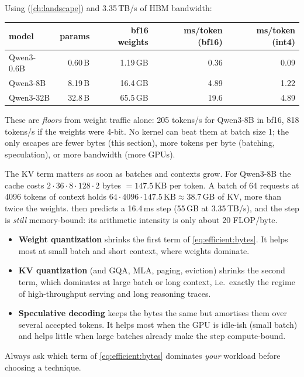 \begin{napkinmath}
Using  (\cref{ch:landscape}) and 3.35\,TB/s of HBM bandwidth:
\begin{center}\small
\begin{tabular}{lrrrr}
\toprule
model & params & bf16 weights & ms/token (bf16) & ms/token (int4) \\
\midrule
Qwen3-0.6B & 0.60\,B & 1.19\,GB & 0.36 & 0.09 \\
Qwen3-8B   & 8.19\,B & 16.4\,GB & 4.89 & 1.22 \\
Qwen3-32B  & 32.8\,B & 65.5\,GB & 19.6 & 4.89 \\
\bottomrule
\end{tabular}
\end{center}
These are \emph{floors} from weight traffic alone: 205 tokens/s for Qwen3-8B in bf16,
818 tokens/s if the weights were 4-bit. No kernel can beat them at batch size 1; the
only escapes are fewer bytes (this section), more tokens per byte (batching,
speculation), or more bandwidth (more GPUs).
\end{napkinmath}

The KV term matters as soon as batches and contexts grow. For Qwen3-8B the cache costs
$2\cdot 36\cdot 8\cdot 128\cdot 2$ bytes $=147.5$\,KB per token. A batch of 64 requests
at 4096 tokens of context holds $64\cdot 4096\cdot 147.5\,\text{KB}\approx 38.7$\,GB of
KV, more than twice the weights.  then predicts a 16.4\,ms step
(55\,GB at 3.35\,TB/s), and the step is \emph{still} memory-bound: its arithmetic
intensity is only about 20 FLOP/byte.

\begin{systemslens}
\begin{itemize}
  \item \textbf{Weight quantization} shrinks the first term of \cref{eq:efficient:bytes}.
        It helps most at small batch and short context, where weights dominate.
  \item \textbf{KV quantization} (and GQA, MLA, paging, eviction) shrinks the second term,
        which dominates at large batch or long context, i.e.\ exactly the regime of
        high-throughput serving and long reasoning traces.
  \item \textbf{Speculative decoding} keeps the bytes the same but amortises them over
        several accepted tokens. It helps most when the GPU is idle-ish (small batch)
        and helps little when large batches already make the step compute-bound.
\end{itemize}
Always ask which term of \cref{eq:efficient:bytes} dominates \emph{your} workload before
choosing a technique.
\end{systemslens}

